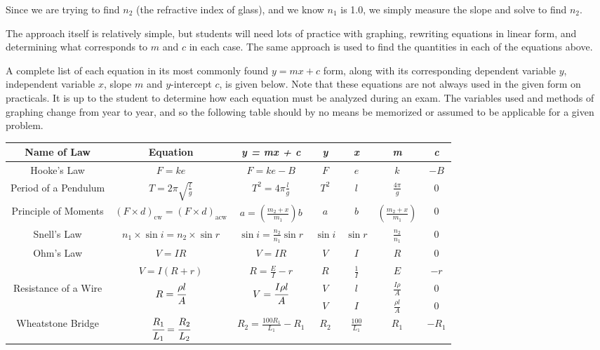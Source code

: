 Since we are trying to find $n_2$ (the refractive index of glass), and we know $n_1$ is 1.0, we
simply measure the slope and solve to find $n_2$.

The approach itself is relatively simple, but students will need lots of practice
with graphing, rewriting equations in linear form, and determining what corresponds to $m$
and $c$ in each case. The same approach is used to find the quantities in each of the
equations above. 

A complete list of each equation in its most commonly found $y = mx + c$ form, along with its corresponding dependent variable $y$, independent variable $x$, slope
$m$ and $y$-intercept $c$, is given below. Note that these equations are not always used in the given form on practicals. It is up to the student to determine how each equation must be analyzed during an exam. The variables used and methods of graphing change from year to year, and so the following table should by no means be memorized or assumed to be applicable for a given problem.

\begin{center}
\begin{tabular}{|c|c|c|c|c|c|c|} \hline
\textbf{Name of Law} & \textbf{Equation} & \textit{\textbf{y = mx + c}} & \textit{\textbf{y}} & \textit{\textbf{x}} & \textit{\textbf{m}} & \textit{\textbf{c}} \\ \hline \hline
Hooke's Law & $ F = ke $ & $ F = ke - B $ & $F$ & $e$ & $k$ & $-B$\\ \hline
Period of a Pendulum & $T = 2\pi\sqrt{\frac{l}{g}}$ & $T^2 = 4\pi \frac{l}{g}$ & $T^2$ & $l$ & $\frac{4\pi}{g}$ & 0\\ \hline
Principle of Moments & $(F \times d)_{\mathrm{cw}} = (F \times d)_{\mathrm{acw}}$ & $a = \left(\frac{m_2 + x}{m_1}\right)b$ & $a$ & $b$ & $\left(\frac{m_2 + x}{m_1}\right)$ & 0\\ \hline
Snell's Law & $n_1 \times \sin{i} = n_2 \times \sin{r}$ & $\sin{i} = \frac{n_2}{n_1}\sin{r}$ & $\sin{i}$ & $\sin{r}$ & $\frac{n_2}{n_1}$ & 0\\ \hline
\multirow{2}{*}{Ohm's Law} & $V=IR$ & $V=IR$ & $V$ & $I$ & $R$ & 0 \\ 
& $V = I(R + r)$ & $R = \frac{E}{I} - r$ & $R$ & $\frac{1}{I}$ & $E$ & $-r$ \\ \hline
\multirow{2}{*}{Resistance of a Wire} & \multirow{2}{*}{$R = \cfrac{\rho l}{A}$} & \multirow{2}{*}{$V = \cfrac{I\rho l}{A}$} & $V$ & $l$ & $\frac{I\rho}{A}$ & 0\\ 
& & & $V$ & $I$ & $\frac{\rho l}{A}$ & 0 \\ \hline
Wheatstone Bridge & $\cfrac{R_1}{L_1} = \cfrac{R_2}{L_2}$ & $R_2 = \frac{100R_1}{L_1} - R_1$ & $R_2$ & $\frac{100}{L_1}$ & $R_1$ & $-R_1$ \\ \hline
\end{tabular}
\end{center}

